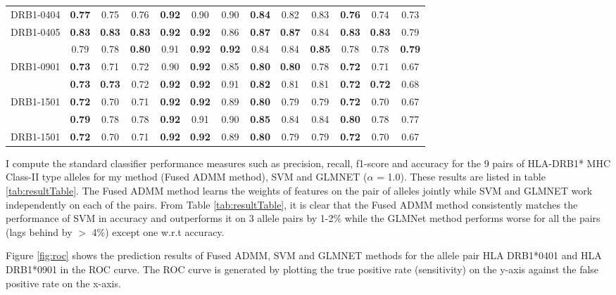 \documentclass[conference,10pt,draftclsnofoot,onecolumn]{IEEEtran}
\begin{document}
\begin{table}[!t]
\begin{tabular}{|c|c|c|c|c|c|c|c|c|c|c|c|c|}
\multirow{1}{*}{DRB1-0404}  & \bf 0.77 & 0.75 & 0.76 & \bf 0.92 & 0.90 & 0.90 & \bf 0.84 & 0.82 & 0.83 & \bf 0.76 & 0.74 & 0.73\\
\cline{2-13}
DRB1-0405 & \bf 0.83 & \bf 0.83 & \bf 0.83 & \bf 0.92 & \bf 0.92 & 0.86 & \bf 0.87 & \bf 0.87 & 0.84 & \bf 0.83 & \bf 0.83 & 0.79\\
\hhline{=============}

\multirow{1}{*}{DRB1-0701} & 0.79 & 0.78 & \bf 0.80 & 0.91 & \bf 0.92 & \bf 0.92 & 0.84 & 0.84 & \bf 0.85 & 0.78 & 0.78 & \bf0.79\\
\cline{2-13}
DRB1-0901 & \bf 0.73 & 0.71 & 0.72 & 0.90 & \bf 0.92 & 0.85 & \bf 0.80 & \bf 0.80 & 0.78 & \bf 0.72 & 0.71 & 0.67\\
\hhline{=============}

\multirow{1}{*}{DRB1-0401} & \bf 0.73 & \bf 0.73 & 0.72 & \bf 0.92 & \bf 0.92 & 0.91 & \bf 0.82 & 0.81 & 0.81 & \bf 0.72 & \bf 0.72 & 0.68\\
\cline{2-13}
DRB1-1501 & \bf 0.72 & 0.70 & 0.71 & \bf 0.92 & \bf 0.92 & 0.89 & \bf 0.80 & 0.79 & 0.79 & \bf 0.72 & 0.70 & 0.67\\
\hhline{=============}

\multirow{1}{*}{DRB1-1101} & \bf 0.79 & 0.78 & 0.78 & \bf 0.92 & 0.91 & 0.90 & \bf 0.85 & 0.84 & 0.84 & \bf 0.80 & 0.78 & 0.77\\
\cline{2-13}
DRB1-1501 & \bf 0.72 & 0.70 & 0.71 & \bf 0.92 & \bf 0.92 & 0.89 & \bf 0.80 & 0.79 & 0.79 & \bf 0.72 & 0.70 & 0.67\\
\hline
\end{tabular}
\end{table}

I compute the standard classifier performance measures such as precision, recall, f1-score and accuracy for the 9 pairs of HLA-DRB1* MHC Class-II type alleles for my method (Fused ADMM method), SVM and GLMNET ($\alpha$ = 1.0).  These results are listed in table \ref{tab:resultTable}. The Fused ADMM method learns the weights of features on the pair of alleles jointly while SVM and GLMNET work independently on each of the pairs. From Table \ref{tab:resultTable}, it is clear that the Fused ADMM method consistently matches the performance of SVM in accuracy and outperforms it on 3 allele pairs by 1-2\% while the GLMNet method performs worse for all the pairs (lags behind by $>$ 4\%) except one w.r.t accuracy.

Figure \ref{fig:roc} shows the prediction results of Fused ADMM, SVM and GLMNET methods for the allele pair HLA DRB1*0401 and HLA DRB1*0901 in the ROC curve. The ROC curve is generated by plotting the true positive rate (sensitivity) on the y-axis against the false positive rate on the x-axis.
\end{document}
